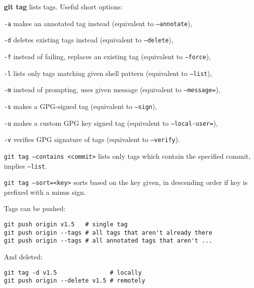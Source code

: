 %

\textbf{git tag} lists tags.
Useful short options:
\begin{compactenum}
\item [\texttt{-a}] makes an annotated tag instead (equivalent to \texttt{--annotate}),
\item [\texttt{-d}] deletes existing tags instead (equivalent to \texttt{--delete}),
\item [\texttt{-f}] instead of failing, replaces an existing tag (equivalent to \texttt{--force}),
\item [\texttt{-l}] lists only tags matching given shell pattern (equivalent to \texttt{--list}),
\item [\texttt{-m}] instead of prompting, uses given message (equivalent to \texttt{--message=}),
\item [\texttt{-s}] makes a GPG-signed tag (equivalent to \texttt{--sign}),
\item [\texttt{-u}] makes a custom GPG key signed tag (equivalent to \texttt{--local-user=}),
\item [\texttt{-v}] verifies GPG signature of tags (equivalent to \texttt{--verify}).
\end{compactenum}

\texttt{git tag --contains <commit>} lists only tags which contain the specified commit, implies \texttt{--list}.

\texttt{git tag --sort=<key>} sorts based on the key given, in descending order if key is prefixed with a minus sign.

Tags can be pushed:

\begin{verbatim}
git push origin v1.5   # single tag
git push origin --tags # all tags that aren't already there
git push origin --tags # all annotated tags that aren't ...
\end{verbatim}

And deleted:

\begin{verbatim}
git tag -d v1.5               # locally
git push origin --delete v1.5 # remotely
\end{verbatim}

%